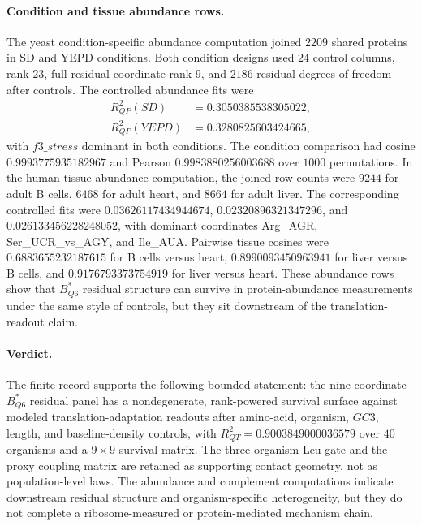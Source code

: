 \paragraph{Condition and tissue abundance rows.}
The yeast condition-specific abundance computation joined $2209$ shared proteins in SD and YEPD conditions.  Both condition designs used $24$ control columns, rank $23$, full residual coordinate rank $9$, and $2186$ residual degrees of freedom after controls.  The controlled abundance fits were
$$
\begin{aligned}
R^2_{QP}(SD) &= 0.3050385538305022,\\
R^2_{QP}(YEPD) &= 0.3280825603424665,
\end{aligned}
$$
with $f3\_stress$ dominant in both conditions.  The condition comparison had cosine $0.9993775935182967$ and Pearson $0.9983880256003688$ over $1000$ permutations.  In the human tissue abundance computation, the joined row counts were $9244$ for adult B cells, $6468$ for adult heart, and $8664$ for adult liver.  The corresponding controlled fits were $0.03626117434944674$, $0.02320896321347296$, and $0.026133456228248052$, with dominant coordinates Arg\_AGR, Ser\_UCR\_vs\_AGY, and Ile\_AUA.  Pairwise tissue cosines were $0.6883655232187615$ for B cells versus heart, $0.8990093450963941$ for liver versus B cells, and $0.9176793373754919$ for liver versus heart.  These abundance rows show that $B^*_{Q6}$ residual structure can survive in protein-abundance measurements under the same style of controls, but they sit downstream of the translation-readout claim.

\paragraph{Verdict.}
The finite record supports the following bounded statement: the nine-coordinate $B^*_{Q6}$ residual panel has a nondegenerate, rank-powered survival surface against modeled translation-adaptation readouts after amino-acid, organism, $GC3$, length, and baseline-density controls, with $R^2_{QT}=0.9003849000036579$ over $40$ organisms and a $9\times 9$ survival matrix.  The three-organism Leu gate and the proxy coupling matrix are retained as supporting contact geometry, not as population-level laws.  The abundance and complement computations indicate downstream residual structure and organism-specific heterogeneity, but they do not complete a ribosome-measured or protein-mediated mechanism chain.

